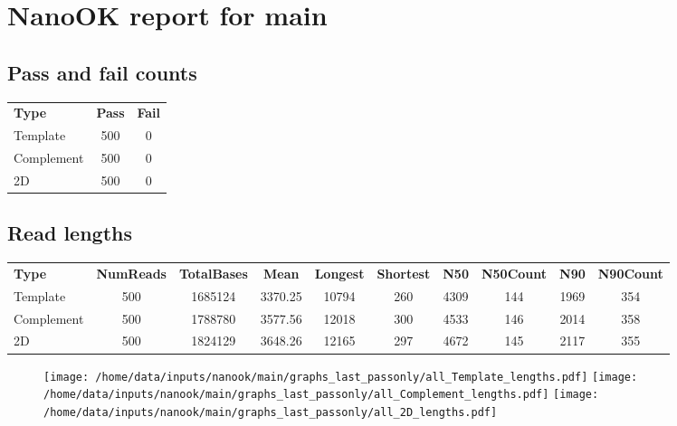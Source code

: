 \documentclass[a4paper,11pt,oneside]{article}
\begin{document}
\renewcommand*{\familydefault}{\sfdefault}
\normalfont
\section*{\large{NanoOK report for main}}
\subsection*{Pass and fail counts}
\vspace{-3mm}
\begin{table}[H]
{\footnotesize
\fontsize{9pt}{11pt}\selectfont
\begin{tabular}{l c c}
{\bf Type} & {\bf Pass} & {\bf Fail} \\
Template & 500 & 0  \\
Complement & 500 & 0  \\
2D & 500 & 0  \\
\end{tabular}
}
\end{table}
\subsection*{Read lengths}
\vspace{-3mm}
\begin{table}[H]
{\footnotesize
\fontsize{9pt}{11pt}\selectfont
\begin{tabular}{l c c c c c c c c c}
{\bf Type} & {\bf NumReads} & {\bf TotalBases} & {\bf Mean} & {\bf Longest} & {\bf Shortest} & {\bf N50} & {\bf N50Count} & {\bf N90} & {\bf N90Count} \\
Template & 500 & 1685124 & 3370.25 & 10794 & 260 & 4309 & 144 & 1969 & 354 \\
Complement & 500 & 1788780 & 3577.56 & 12018 & 300 & 4533 & 146 & 2014 & 358 \\
2D & 500 & 1824129 & 3648.26 & 12165 & 297 & 4672 & 145 & 2117 & 355 \\
\end{tabular}
}
\end{table}
\vspace{-10mm}
\begin{figure}[H]
\centering
\texttt{[image: /home/data/inputs/nanook/main/graphs\_last\_passonly/all\_Template\_lengths.pdf]}
\texttt{[image: /home/data/inputs/nanook/main/graphs\_last\_passonly/all\_Complement\_lengths.pdf]}
\texttt{[image: /home/data/inputs/nanook/main/graphs\_last\_passonly/all\_2D\_lengths.pdf]}
\end{figure}
\end{document}
